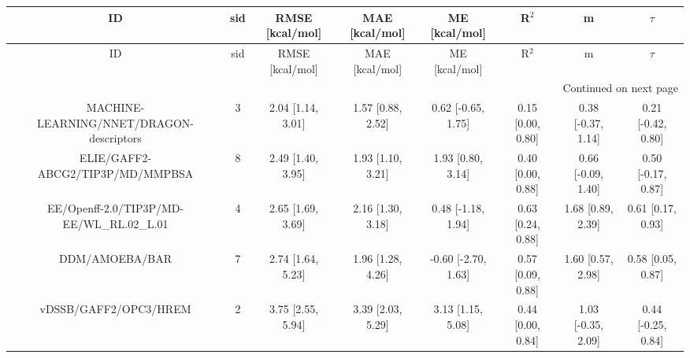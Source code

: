 \documentclass[8pt]{article}
\begin{document}
\begin{center}
\begin{footnotesize}
\begin{longtable}{|cccccccc|}
\toprule
                                       ID & sid &   RMSE [kcal/mol] &    MAE [kcal/mol] &       ME [kcal/mol] &             R$^2$ &                  m &             $\tau$ \\
\midrule
\endfirsthead

\toprule
                                       ID & sid &   RMSE [kcal/mol] &    MAE [kcal/mol] &       ME [kcal/mol] &             R$^2$ &                  m &             $\tau$ \\
\midrule
\endhead
\midrule
\multicolumn{8}{r}{{Continued on next page}} \\
\midrule
\endfoot

\bottomrule
\endlastfoot
 MACHINE-LEARNING/NNET/DRAGON-descriptors &   3 & 2.04 [1.14, 3.01] & 1.57 [0.88, 2.52] &  0.62 [-0.65, 1.75] & 0.15 [0.00, 0.80] & 0.38 [-0.37, 1.14] & 0.21 [-0.42, 0.80] \\
         ELIE/GAFF2-ABCG2/TIP3P/MD/MMPBSA &   8 & 2.49 [1.40, 3.95] & 1.93 [1.10, 3.21] &   1.93 [0.80, 3.14] & 0.40 [0.00, 0.88] & 0.66 [-0.09, 1.40] & 0.50 [-0.17, 0.87] \\
EE/Openff-2.0/TIP3P/MD-EE/WL\_RL.02\_L.01 &   4 & 2.65 [1.69, 3.69] & 2.16 [1.30, 3.18] &  0.48 [-1.18, 1.94] & 0.63 [0.24, 0.88] &  1.68 [0.89, 2.39] &  0.61 [0.17, 0.93] \\
                           DDM/AMOEBA/BAR &   7 & 2.74 [1.64, 5.23] & 1.96 [1.28, 4.26] & -0.60 [-2.70, 1.63] & 0.57 [0.09, 0.88] &  1.60 [0.57, 2.98] &  0.58 [0.05, 0.87] \\
                    vDSSB/GAFF2/OPC3/HREM &   2 & 3.75 [2.55, 5.94] & 3.39 [2.03, 5.29] &   3.13 [1.15, 5.08] & 0.44 [0.00, 0.84] & 1.03 [-0.35, 2.09] & 0.44 [-0.25, 0.84] \\
\end{longtable}
\end{footnotesize}
\end{center}
\end{document}
